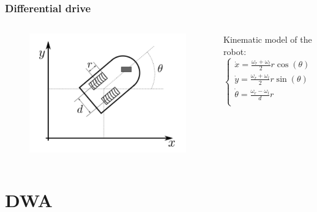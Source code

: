 \documentclass{beamer}
\begin{document}
\begin{frame}
\frametitle{Differential drive}

\begin{columns}


\begin{figure}[H]
    \centering
    \includegraphics[scale=0.45]{img/other/differential_drive.png}
\end{figure}


Kinematic model of the robot:
$$
\begin{cases}
    \dot{x} = \frac{\omega_r + \omega_l}{2} r \cos(\theta) \\
    \dot{y} = \frac{\omega_r + \omega_l}{2} r \sin(\theta) \\
    \dot{\theta} = \frac{\omega_r - \omega_l}{d} r \\
\end{cases}
$$

\end{columns}


\end{frame}



\section{DWA}

\end{document}
